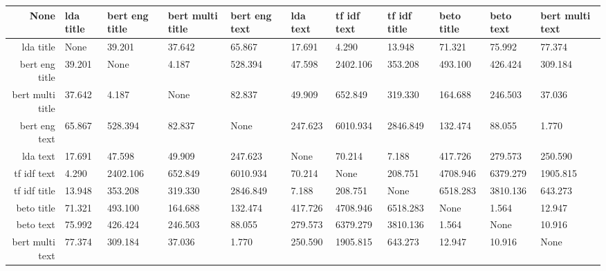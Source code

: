 \begin{tabular}{|r|l|l|l|l|l|l|l|l|l|l|}
  \hline
  None & lda title & bert eng title & bert multi title & bert eng text & lda text & tf idf text & tf idf title & beto title & beto text & bert multi text \\ 
  \hline
  lda title & None & 39.201 & 37.642 & 65.867 & 17.691 & 4.290 & 13.948 & 71.321 & 75.992 & 77.374 \\ 
  \hline
  bert eng title & 39.201 & None & 4.187 & 528.394 & 47.598 & 2402.106 & 353.208 & 493.100 & 426.424 & 309.184 \\ 
  \hline
  bert multi title & 37.642 & 4.187 & None & 82.837 & 49.909 & 652.849 & 319.330 & 164.688 & 246.503 & 37.036 \\ 
  \hline
  bert eng text & 65.867 & 528.394 & 82.837 & None & 247.623 & 6010.934 & 2846.849 & 132.474 & 88.055 & 1.770 \\ 
  \hline
  lda text & 17.691 & 47.598 & 49.909 & 247.623 & None & 70.214 & 7.188 & 417.726 & 279.573 & 250.590 \\ 
  \hline
  tf idf text & 4.290 & 2402.106 & 652.849 & 6010.934 & 70.214 & None & 208.751 & 4708.946 & 6379.279 & 1905.815 \\ 
  \hline
  tf idf title & 13.948 & 353.208 & 319.330 & 2846.849 & 7.188 & 208.751 & None & 6518.283 & 3810.136 & 643.273 \\ 
  \hline
  beto title & 71.321 & 493.100 & 164.688 & 132.474 & 417.726 & 4708.946 & 6518.283 & None & 1.564 & 12.947 \\ 
  \hline
  beto text & 75.992 & 426.424 & 246.503 & 88.055 & 279.573 & 6379.279 & 3810.136 & 1.564 & None & 10.916 \\ 
  \hline
  bert multi text & 77.374 & 309.184 & 37.036 & 1.770 & 250.590 & 1905.815 & 643.273 & 12.947 & 10.916 & None \\ 
  \hline
\end{tabular}
